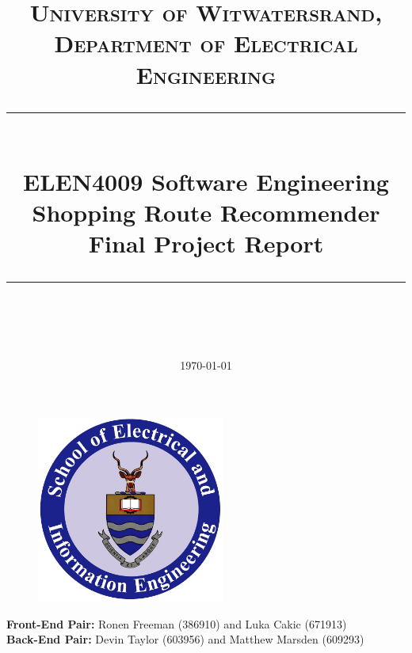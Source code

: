 \documentclass[10pt, a4paper, twocolumn]{scrartcl}
\begin{document}
 

\onecolumn
\thispagestyle{empty}

\newcommand{\horrule}[1]{\rule{\linewidth}{#1}}

	\title{\normalfont \normalsize
		\textsc{University of Witwatersrand, Department of Electrical Engineering} \\ [10pt]
		\horrule{0.5pt} \\ [10pt]
		\huge ELEN4009 Software Engineering \\ Shopping Route Recommender Final Project Report \\
		\horrule{2pt} \\ }
	\date {\normalsize \today}
	
	\maketitle

	\begin{figure}[h!]
		\centering
		\includegraphics[width = 0.55\textwidth]{Images/witsLogo.jpg}
	\end{figure}

\vspace{60pt}
\textbf{Front-End Pair:} Ronen Freeman (386910) and Luka Cakic (671913) \\

\textbf{Back-End Pair:} Devin Taylor (603956) and Matthew Marsden (609293)
\end{document}
